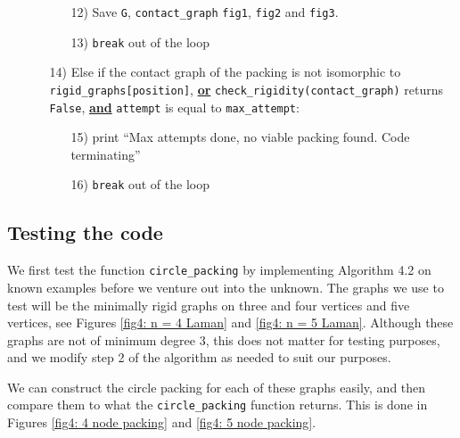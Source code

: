 \begin{flushleft}
\begin{enumerate}
\begin{enumerate}
        \begin{enumerate}
            \item[12)] Save \texttt{G}, \texttt{contact\_graph} \texttt{fig1}, \texttt{fig2} and \texttt{fig3}.
            \vspace{-1mm}
            \item[13)] \texttt{break} out of the loop
        \end{enumerate}
        \vspace{-1mm}
        \item[14)] Else if the contact graph of the packing is not isomorphic to \texttt{rigid\_graphs[position]}, \textbf{\underline{or}} \texttt{check\_rigidity(contact\_graph)} returns \texttt{False}, \textbf{\underline{and}} \texttt{attempt} is equal to \texttt{max\_attempt}:
        \begin{enumerate}
            \item[15)] print ``Max attempts done, no viable packing found. Code terminating''
            \vspace{-1mm}
            \item[16)] \texttt{break} out of the loop
        \end{enumerate}
    \end{enumerate}
\end{enumerate}
\end{flushleft}

\subsection{Testing the code}

\begin{flushleft}
We first test the function \texttt{circle\_packing} by implementing Algorithm 4.2 on known examples before we venture out into the unknown. The graphs we use to test will be the minimally rigid graphs on three and four vertices and five vertices, see Figures  \ref{fig4: n = 4 Laman} and \ref{fig4: n = 5 Laman}. Although these graphs are not of minimum degree 3, this does not matter for testing purposes, and we modify step 2 of the algorithm as needed to suit our purposes. 
\end{flushleft}

\begin{flushleft}
We can construct the circle packing for each of these graphs easily, and then compare them to what the \texttt{circle\_packing} function returns. This is done in Figures \ref{fig4: 4 node packing} and \ref{fig4: 5 node packing}.
\end{flushleft}

